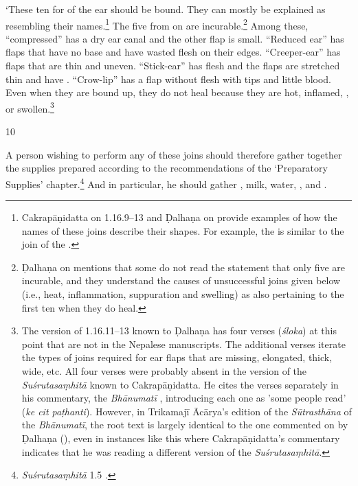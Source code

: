 \begin{translation}
    `These ten  for  of the ear should be
    bound.  They can mostly be explained as resembling their names.\footnote{Cakrapāṇidatta on 1.16.9–13 \citep[128–129]{acar-1939} and Ḍalhaṇa on  provide examples of how the names of these joins describe their shapes. For example, the  is similar to the join of the .}  The five from  on are incurable.\footnote{Ḍalhaṇa on  mentions that some do not read the statement that only five are incurable, and they understand the causes of unsuccessful joins given below (i.e., heat, inflammation, suppuration and swelling) as also pertaining to the first ten when they do heal.}  Among these, “compressed” has a dry ear canal and the other flap is small.   “Reduced ear” has 
    flaps that have no base and have wasted flesh on their edges. “Creeper-ear” has 
    flaps that are thin and uneven. “Stick-ear” has  flesh and the 
    flaps are stretched thin and have  .  “Crow-lip” 
    has a flap 
    without flesh with  tips and little blood. Even when 
    they are bound up, they do not heal because they are hot, inflamed, 
    , or swollen.\footnote{The version of 1.16.11–13 known to Ḍalhaṇa \citep[78]{vulgate} has four verses (\emph{śloka}) at this point that are not in the Nepalese manuscripts. The additional verses iterate the types of joins required for ear flaps that are missing, elongated, thick, wide, etc. All four verses were probably absent in the version of the \emph{Suśrutasaṃhitā} known to Cakrapāṇidatta. He cites the verses separately in his commentary, the \emph{Bhānumatī} \citep[128–129]{acar-1939}, introducing each one as 'some people read' (\emph{ke cit paṭhanti}). However,  in Trikamajī Ācārya's edition of the \emph{Sūtrasthāna} of the \emph{Bhānumatī}, the root text is largely identical to the one commented on by Ḍalhaṇa (\cite{vulgate}), even in instances like this where Cakrapāṇidatta's commentary indicates that he was reading a different version of the \emph{Suśrutasaṃhitā}.}
    
    \item[10]  
    
    A person wishing to perform any of these joins should therefore gather together the
    supplies prepared according to the recommendations of the `Preparatory
    Supplies' chapter.\footnote{\emph{Suśrutasaṃhitā} 1.5 \citep[18–23]{vulgate}.}  And in particular, he should gather
    , milk, water,
    , and .  
    

\end{translation}

